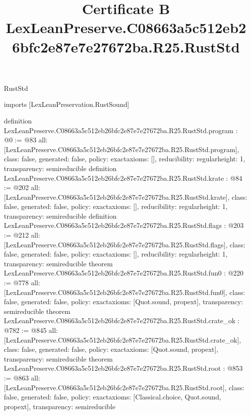 \begin{lexlean}{RustStd}
\title{Certificate B LexLeanPreserve.C08663a5c512eb26bfc2e87e7e27672ba.R25.RustStd}
\begin{coremodule}
imports [LexLeanPreservation.RustSound]

definition LexLeanPreserve.C08663a5c512eb26bfc2e87e7e27672ba.R25.RustStd.program : @0 := @83 {
  all: [LexLeanPreserve.C08663a5c512eb26bfc2e87e7e27672ba.R25.RustStd.program],
  class: false,
  generated: false,
  policy: exact{axioms: []},
  reducibility: regular{height: 1},
  transparency: semireducible
}
definition LexLeanPreserve.C08663a5c512eb26bfc2e87e7e27672ba.R25.RustStd.krate : @84 := @202 {
  all: [LexLeanPreserve.C08663a5c512eb26bfc2e87e7e27672ba.R25.RustStd.krate],
  class: false,
  generated: false,
  policy: exact{axioms: []},
  reducibility: regular{height: 1},
  transparency: semireducible
}
definition LexLeanPreserve.C08663a5c512eb26bfc2e87e7e27672ba.R25.RustStd.flags : @203 := @212 {
  all: [LexLeanPreserve.C08663a5c512eb26bfc2e87e7e27672ba.R25.RustStd.flags],
  class: false,
  generated: false,
  policy: exact{axioms: []},
  reducibility: regular{height: 1},
  transparency: semireducible
}
theorem LexLeanPreserve.C08663a5c512eb26bfc2e87e7e27672ba.R25.RustStd.fun0 : @220 := @778 {
  all: [LexLeanPreserve.C08663a5c512eb26bfc2e87e7e27672ba.R25.RustStd.fun0],
  class: false,
  generated: false,
  policy: exact{axioms: [Quot.sound, propext]},
  transparency: semireducible
}
theorem LexLeanPreserve.C08663a5c512eb26bfc2e87e7e27672ba.R25.RustStd.crate_ok : @782 := @845 {
  all: [LexLeanPreserve.C08663a5c512eb26bfc2e87e7e27672ba.R25.RustStd.crate_ok],
  class: false,
  generated: false,
  policy: exact{axioms: [Quot.sound, propext]},
  transparency: semireducible
}
theorem LexLeanPreserve.C08663a5c512eb26bfc2e87e7e27672ba.R25.RustStd.root : @853 := @863 {
  all: [LexLeanPreserve.C08663a5c512eb26bfc2e87e7e27672ba.R25.RustStd.root],
  class: false,
  generated: false,
  policy: exact{axioms: [Classical.choice, Quot.sound, propext]},
  transparency: semireducible
}


\end{coremodule}
\end{lexlean}

